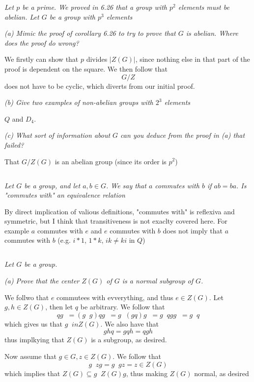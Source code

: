 \documentclass[11pt,oneside,titlepage]{book}
\DeclareMathOperator \inv {^{-1}}
\begin{document}
\textit{Let $p$ be a prime. We proved in 6.26 that a group with $p^2$
  elements must be abelian. Let $G$ be a group with $p^3$ elements}

\textit{(a) Mimic the proof of corollary 6.26 to try to prove that $G$ is
  abelian. Where does the proof do wrong?}

We firstly can show that $p$ divides $|Z(G)|$, since nothing else in
that part of the proof is dependent on the square. We then follow that
$$G/Z$$
does not have to be cyclic, which diverts from our initial proof.


\textit{(b) Give two examples of non-abelian groups with $2^3$ elements}

$Q$ and $D_4$.

\textit{(c) What sort of information about $G$ can you deduce from the
  proof in (a) that failed?}

That $G/Z(G)$ is an abelian group (since its order is $p^2$)

\subsection{}

\textit{Let $G$ be a group, and let $a, b \in G$. We say that $a$
commutes with $b$ if $ab = ba$. Is "commutes with" an equivalence
relation}

By direct implication of valious definitions, "commutes with"
is reflexiva and symmetric, but I think that transitiveness
is not exaclty covered here. For example $a$ commutes with $e$
and $e$ commutes with $b$ does not imply that $a$ commutes with
$b$ (e.g. $i * 1$, $1 * k$, $ik \neq ki$ in $Q$)

\subsection{}

\textit{Let $G$ be a group.}

\textit{(a) Prove that the center $Z(G)$ of $G$ is a normal subgroup of $G$.}

We follwo that $e$ commutees with evverything, and thus $e \in Z(G)$.
Let $g, h \in Z(G)$, then let $q$ be arbitrary. We follow that
$$q g\inv = (g\inv g )q g\inv = g\inv (g q) g\inv = g\inv qg  g\inv = g\inv q$$
which gives us that $g\inv in Z(G)$. We also have that
$$ghq = gqh = qgh$$
thus implkying that $Z(G)$ is a subgroup, as desired.

Now assume that $g \in G, z \in Z(G)$. We follow that
$$g\inv z g = g\inv g z = z \in Z(G)$$
which implies that $Z(G) \subseteq g\inv Z(G) g$, thus making $Z(G)$
normal, as desired
\end{document}
